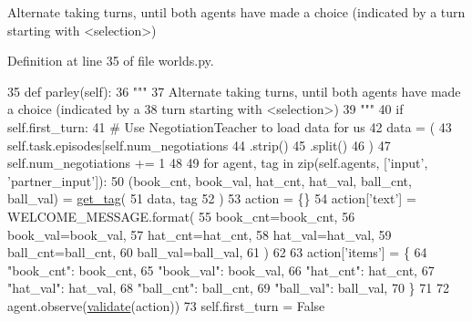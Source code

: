 \begin{DoxyVerb}Alternate taking turns, until both agents have made a choice (indicated by a
turn starting with <selection>)
\end{DoxyVerb}
 

Definition at line 35 of file worlds.\+py.


\begin{DoxyCode}
35     \textcolor{keyword}{def }parley(self):
36         \textcolor{stringliteral}{"""}
37 \textcolor{stringliteral}{        Alternate taking turns, until both agents have made a choice (indicated by a}
38 \textcolor{stringliteral}{        turn starting with <selection>)}
39 \textcolor{stringliteral}{        """}
40         \textcolor{keywordflow}{if} self.first\_turn:
41             \textcolor{comment}{# Use NegotiationTeacher to load data for us}
42             data = (
43                 self.task.episodes[self.num\_negotiations %
44                 .strip()
45                 .split()
46             )
47             self.num\_negotiations += 1
48 
49             \textcolor{keywordflow}{for} agent, tag \textcolor{keywordflow}{in} zip(self.agents, [\textcolor{stringliteral}{'input'}, \textcolor{stringliteral}{'partner\_input'}]):
50                 (book\_cnt, book\_val, hat\_cnt, hat\_val, ball\_cnt, ball\_val) = 
      \hyperlink{namespaceparlai_1_1tasks_1_1dealnodeal_1_1agents_a7a1e5d8435af234bbf07491e866bb1fd}{get\_tag}(
51                     data, tag
52                 )
53                 action = \{\}
54                 action[\textcolor{stringliteral}{'text'}] = WELCOME\_MESSAGE.format(
55                     book\_cnt=book\_cnt,
56                     book\_val=book\_val,
57                     hat\_cnt=hat\_cnt,
58                     hat\_val=hat\_val,
59                     ball\_cnt=ball\_cnt,
60                     ball\_val=ball\_val,
61                 )
62 
63                 action[\textcolor{stringliteral}{'items'}] = \{
64                     \textcolor{stringliteral}{"book\_cnt"}: book\_cnt,
65                     \textcolor{stringliteral}{"book\_val"}: book\_val,
66                     \textcolor{stringliteral}{"hat\_cnt"}: hat\_cnt,
67                     \textcolor{stringliteral}{"hat\_val"}: hat\_val,
68                     \textcolor{stringliteral}{"ball\_cnt"}: ball\_cnt,
69                     \textcolor{stringliteral}{"ball\_val"}: ball\_val,
70                 \}
71 
72                 agent.observe(\hyperlink{namespaceparlai_1_1core_1_1worlds_afc3fad603b7bce41dbdc9cdc04a9c794}{validate}(action))
73             self.first\_turn = \textcolor{keyword}{False}

\end{DoxyCode}
